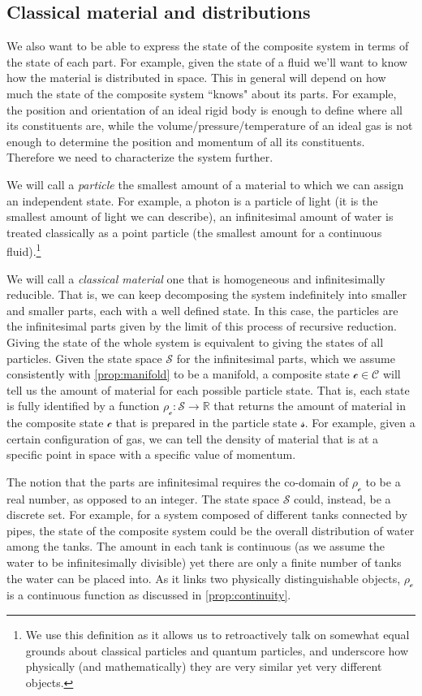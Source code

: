 \documentclass[smallextended]{svjour3}
\numberwithin{equation}{section}
\theoremstyle{definition}
\begin{document}
\subsection{Classical material and distributions}
We also want to be able to express the state of the composite system in terms of the state of each part. For example, given the state of a fluid we'll want to know how the material is distributed in space. This in general will depend on how much the state of the composite system ``knows" about its parts. For example, the position and orientation of an ideal rigid body is enough to define where all its constituents are, while the volume/pressure/temperature of an ideal gas is not enough to determine the position and momentum of all its constituents. Therefore we need to characterize the system further.

We will call a \emph{particle} the smallest amount of a material to which we can assign an independent state. For example, a photon is a particle of light (it is the smallest amount of light we can describe), an infinitesimal amount of water is treated classically as a point particle (the smallest amount for a continuous fluid).\footnote{We use this definition as it allows us to retroactively talk on somewhat equal grounds about classical particles and quantum particles, and underscore how physically (and mathematically) they are very similar yet very different objects.}

We will call a \emph{classical material} one that is homogeneous and infinitesimally reducible. That is, we can keep decomposing the system indefinitely into smaller and smaller parts, each with a well defined state. In this case, the particles are the infinitesimal parts given by the limit of this process of recursive reduction. Giving the state of the whole system is equivalent to giving the states of all particles. Given the state space $\mathcal{S}$ for the infinitesimal parts, which we assume consistently with \ref{prop:manifold} to be a manifold, a composite state $\mathcal{c} \in \mathcal{C}$ will tell us the amount of material for each possible particle state. That is, each state is fully identified by a function $\rho_\mathcal{c}: \mathcal{S} \to \mathbb{R}$ that returns the amount of material in the composite state $\mathcal{c}$ that is prepared in the particle state $\mathcal{s}$. For example, given a certain configuration of gas, we can tell the density of material that is at a specific point in space with a specific value of momentum.

The notion that the parts are infinitesimal requires the co-domain of $\rho_\mathcal{c}$ to be a real number, as opposed to an integer. The state space $\mathcal{S}$ could, instead, be a discrete set. For example, for a system composed of different tanks connected by pipes, the state of the composite system could be the overall distribution of water among the tanks. The amount in each tank is continuous (as we assume the water to be infinitesimally divisible) yet there are only a finite number of tanks the water can be placed into. As it links two physically distinguishable objects, $\rho_\mathcal{c}$ is a continuous function as discussed in \ref{prop:continuity}.
\end{document}
